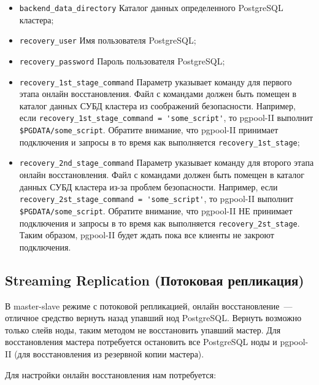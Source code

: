 \begin{itemize}

  \item \lstinline!backend_data_directory! Каталог данных определенного PostgreSQL кластера;
  \item \lstinline!recovery_user! Имя пользователя PostgreSQL;
  \item \lstinline!recovery_password! Пароль пользователя PostgreSQL;
  \item \lstinline!recovery_1st_stage_command! Параметр указывает команду для первого этапа онлайн восстановления. Файл с командами должен быть помещен в каталог данных СУБД кластера из соображений безопасности. Например, если \lstinline!recovery_1st_stage_command = 'some_script'!, то pgpool-II выполнит \lstinline!$PGDATA/some_script!. Обратите внимание, что pgpool-II принимает подключения и запросы в то время как выполняется \lstinline!recovery_1st_stage!;
  \item \lstinline!recovery_2nd_stage_command! Параметр указывает команду для второго этапа онлайн восстановления. Файл с командами должен быть помещен в каталог данных СУБД кластера из-за проблем безопасности. Например, если \lstinline!recovery_2st_stage_command = 'some_script'!, то pgpool-II выполнит \lstinline!$PGDATA/some_script!. Обратите внимание, что pgpool-II НЕ принимает подключения и запросы в то время как выполняется \lstinline!recovery_2st_stage!. Таким образом, pgpool-II будет ждать пока все клиенты не закроют подключения.

\end{itemize}


\subsection{Streaming Replication (Потоковая репликация)}

В master-slave режиме с потоковой репликацией, онлайн восстановление~--- отличное средство вернуть назад упавший нод PostgreSQL. Вернуть возможно только слейв ноды, таким методом не восстановить упавший мастер. Для восстановления мастера потребуется остановить все PostgreSQL ноды и pgpool-II (для восстановления из резервной копии мастера).

Для настройки онлайн восстановления нам потребуется:

